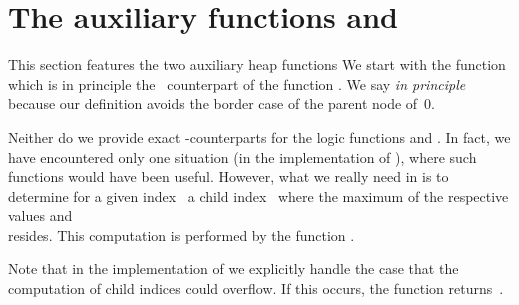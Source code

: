 
\section{The auxiliary functions \heapparent and \heapchild}
\label{sec:auxiliary-heap-functions}
\label{sec:heapparent}
\label{sec:heapchild}

This section features the two auxiliary heap functions
We start with the function 
which is in principle the \isoc~counterpart of the \acsl function .
We say \emph{in principle} because our definition avoids
the border case of the parent node of~0.



Neither do we provide exact \isoc-counterparts for
the logic functions  and .
In fact, we have encountered only one situation (in the implementation of ),
where such functions would have been useful.
However, what we really need in \popheap is to determine
for a given index~ a child index~ where the maximum
of the respective values  and\\
 resides.
This computation is performed by the function .



\clearpage

Note that in the implementation of 
we explicitly handle the case that the computation of child indices
could overflow. If this occurs, the function \heapchild returns~.




